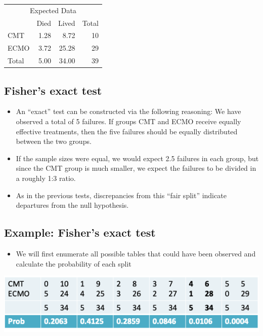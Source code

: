\documentclass[
]{book}
\providecommand{\tightlist}{%
  \setlength{\itemsep}{0pt}\setlength{\parskip}{0pt}}
\begin{document}
\begin{table}
\centering
\begin{tabular}{l|r|r|r}
\hline
\multicolumn{4}{c}{Expected Data} \\
\cline{1-4}
  & Died & Lived & Total\\
\hline
CMT & 1.28 & 8.72 & 10\\
\hline
ECMO & 3.72 & 25.28 & 29\\
\hline
Total & 5.00 & 34.00 & 39\\
\hline
\end{tabular}
\end{table}

\hypertarget{fishers-exact-test}{%
\subsection{Fisher's exact test}\label{fishers-exact-test}}

\begin{itemize}
\tightlist
\item
  An ``exact'' test can be constructed via the following reasoning: We have observed a total of 5 failures. If groups CMT and ECMO receive equally effective treatments, then the five failures should be equally distributed between the two groups.
\item
  If the sample sizes were equal, we would expect 2.5 failures in each group, but since the CMT group is much smaller, we expect the failures to be divided in a roughly 1:3 ratio.
\item
  As in the previous tests, discrepancies from this ``fair split'' indicate departures from the null hypothesis.
\end{itemize}

\hypertarget{example-fishers-exact-test-1}{%
\subsection{Example: Fisher's exact test}\label{example-fishers-exact-test-1}}

\begin{itemize}
\tightlist
\item
  We will first enumerate all possible tables that could have been observed and calculate the probability of each split
\end{itemize}

\includegraphics[width=1\linewidth]{./8_52}
\end{document}
